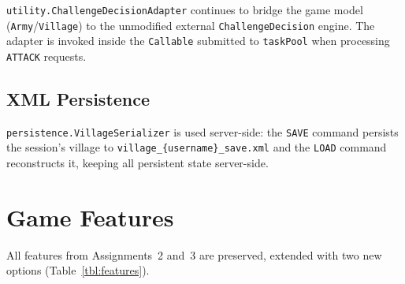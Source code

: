 \documentclass[format=acmsmall, review=false, screen=true]{acmart}
\begin{document}
\texttt{utility.ChallengeDecisionAdapter} continues to bridge the game model
(\texttt{Army}/\texttt{Village}) to the unmodified external
\texttt{ChallengeDecision} engine.  The adapter is invoked inside the
\texttt{Callable} submitted to \texttt{taskPool} when processing
\texttt{ATTACK} requests.

\subsection{XML Persistence}

\texttt{persistence.VillageSerializer} is used server-side: the \texttt{SAVE}
command persists the session's village to
\texttt{village\_\{username\}\_save.xml} and the \texttt{LOAD} command
reconstructs it, keeping all persistent state server-side.

\section{Game Features}

All features from Assignments~2 and~3 are preserved, extended with two new
options (Table~\ref{tbl:features}).
\end{document}
